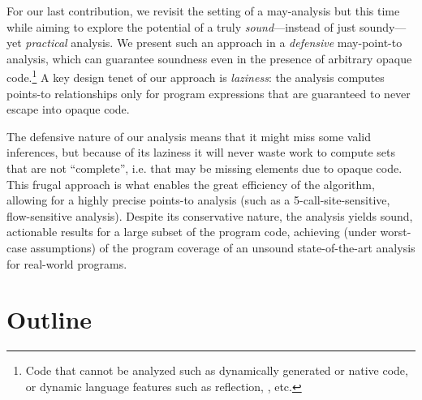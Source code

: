  For our last contribution, we revisit the setting of a may-analysis but this time while aiming to explore the potential of a truly \emph{sound}---instead of just soundy---yet \emph{practical} analysis. We present such an approach in a \emph{defensive} may-point-to analysis, which can guarantee soundness even in the presence of arbitrary opaque code.\footnote{Code that cannot be analyzed such as dynamically generated or native code, or dynamic language features such as reflection, , etc.} A key design tenet of our approach is \emph{laziness}: the analysis computes points-to relationships only for program expressions that are guaranteed to never escape into opaque code.

The defensive nature of our analysis means that it might miss some valid inferences, but because of its laziness it will never waste work to compute sets that are not ``complete'', i.e. that may be missing elements due to opaque code. This frugal approach is what enables the great efficiency of the algorithm, allowing for a highly precise points-to analysis (such as a 5-call-site-sensitive, flow-sensitive analysis). Despite its conservative nature, the analysis yields sound, actionable results for a large subset of the program code, achieving (under worst-case assumptions)  of the program coverage of an unsound state-of-the-art analysis for real-world programs.


\section{Outline}

